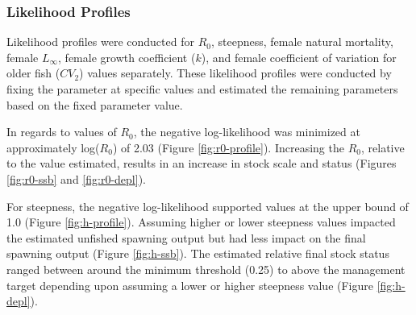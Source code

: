 \documentclass[11pt,
  english,
  a4paper,
]{article}
\begin{document}

\hypertarget{likelihood-profiles}{%
\subsubsection{Likelihood Profiles}\label{likelihood-profiles}}

\leavevmode\tagmcend\tagstructend


Likelihood profiles were conducted for {\(R_0\)\leavevmode\tagmcend\tagstructend}, steepness, female natural mortality, female {\(L_{\infty}\)\leavevmode\tagmcend\tagstructend}, female growth coefficient ({\(k\)\leavevmode\tagmcend\tagstructend}), and female coefficient of variation for older fish ({\(CV_2\)\leavevmode\tagmcend\tagstructend}) values separately. These likelihood profiles were conducted by fixing the parameter at specific values and estimated the remaining parameters based on the fixed parameter value.

\leavevmode\tagmcend\tagstructend\par


In regards to values of {\(R_0\)\leavevmode\tagmcend\tagstructend}, the negative log-likelihood was minimized at approximately log({\(R_0\)\leavevmode\tagmcend\tagstructend}) of 2.03 (Figure \ref{fig:r0-profile}). Increasing the {\(R_0\)\leavevmode\tagmcend\tagstructend}, relative to the value estimated, results in an increase in stock scale and status (Figures \ref{fig:r0-ssb} and \ref{fig:r0-depl}).

\leavevmode\tagmcend\tagstructend\par


For steepness, the negative log-likelihood supported values at the upper bound of 1.0 (Figure \ref{fig:h-profile}). Assuming higher or lower steepness values impacted the estimated unfished spawning output but had less impact on the final spawning output (Figure \ref{fig:h-ssb}). The estimated relative final stock status ranged between around the minimum threshold (0.25) to above the management target depending upon assuming a lower or higher steepness value (Figure \ref{fig:h-depl}).
\end{document}
